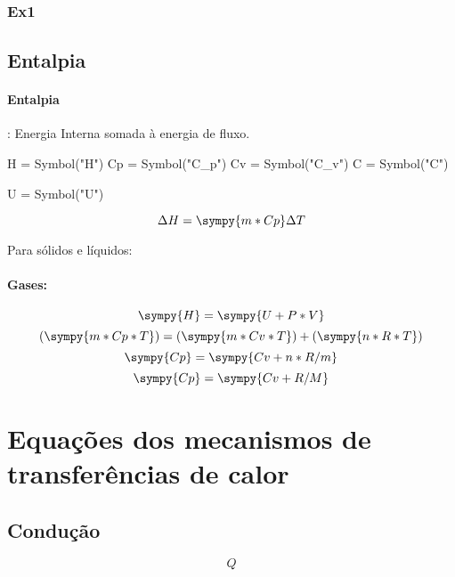 \documentclass[a4paper,twocolumn,11pt]{book}
\begin{document}
\subsubsection{Ex1}
\subsection{Entalpia}
\paragraph{Entalpia} : Energia Interna somada à energia de fluxo. 

\begin{sympycode}
H = Symbol("H")
Cp = Symbol("C_p")
Cv = Symbol("C_v")
C = Symbol("C")

U = Symbol("U")
\end{sympycode}

\begin{equation}
\Delta H = \sympy{m*Cp}\Delta T
\end{equation}

Para sólidos e líquidos:

\paragraph{Gases:}
$$\sympy{H} = \sympy{U+ P*V}$$
$$(\sympy{m*Cp*T}) = (\sympy{m*Cv*T}) + (\sympy{n*R*T})$$
$$\sympy{Cp} = \sympy{Cv+n*R/m}$$
\begin{equation}
\sympy{Cp} = \sympy{Cv+R/M}
\end{equation}

\section{Equações dos mecanismos de transferências de calor}
\subsection{Condução}
\begin{equation}
Q
\end{equation}
\end{document}
